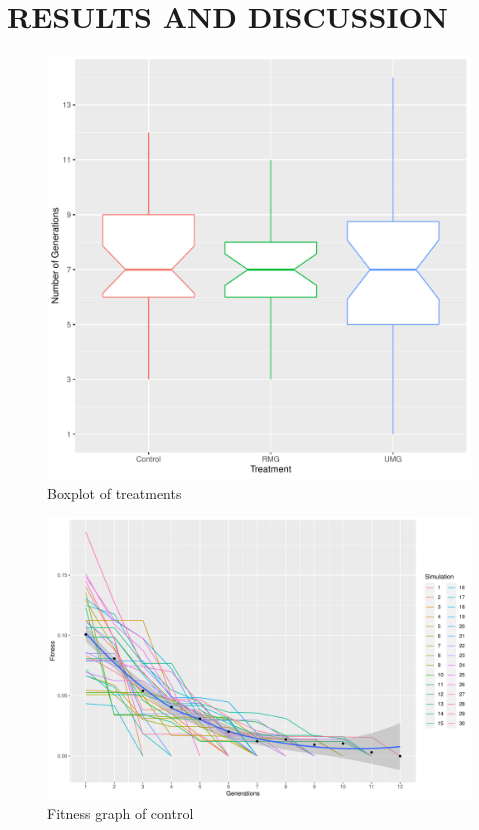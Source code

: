 \documentclass{strrespaper-trad}
\begin{document}
	\chapter{RESULTS AND DISCUSSION}
		\begin{figure}[htbp]
			\centering
			\includegraphics[width=\textwidth]{../figures/boxplot}
			\caption{Boxplot of treatments}
			\label{fig:boxplot}
		\end{figure}
		\begin{figure}[htbp]
			\centering
			\includegraphics[width=\textwidth]{../figures/ctrl_ftrack}
			\caption{Fitness graph of control}
			\label{fig:fitgraph_ctrl}
		\end{figure}
\end{document}
